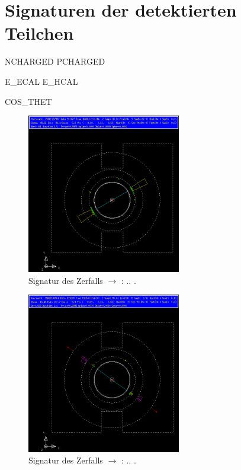 \section{Signaturen der detektierten Teilchen}

NCHARGED
PCHARGED

E\_ECAL
E\_HCAL

COS\_THET


\begin{figure}[H]
\begin{center}
  \includegraphics[width=0.6\textwidth]{../img/gropepics/ee1b.png}
  \caption{Signatur des Zerfalls \Z $\to$ \ee: .. .}
  \label{img:sig:ee}
\end{center}
\end{figure} 

\begin{figure}[H]
\begin{center}
  \includegraphics[width=0.6\textwidth]{../img/gropepics/mm1b.png}
  \caption{Signatur des Zerfalls \Z $\to$ \mm: .. .}
  \label{img:sig:mm}
\end{center}
\end{figure} 

